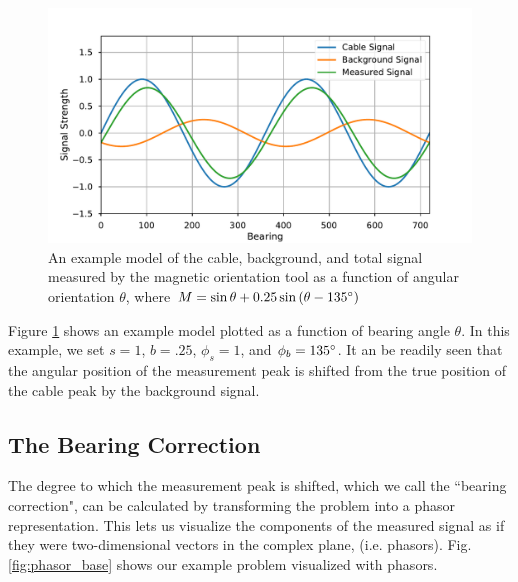 \documentclass[paper=a4, fontsize=11pt]{scrartcl}
\numberwithin{equation}{section}		%
\numberwithin{figure}{section}			%
\numberwithin{table}{section}				%
\begin{document}
\begin{appendices}
\begin{figure}[h!]
  \caption{An example model of the cable, background, and total signal measured by the magnetic orientation tool as a function of angular orientation $\theta$, where $M = \sin\theta + 0.25 \sin\left(\theta -135\degree\right)$
  }
  \label{fig:sigs_vs_bearing}
  \centering
  \includegraphics[width=1.0\textwidth]{figures/sigs_vs_bearing.pdf}
\end{figure}

Figure \ref{fig:sigs_vs_bearing} shows an example model plotted as a function of bearing angle $\theta$.  In this example, we set $s=1$, $b=.25$, $\phi_s=1$, and $\phi_b=135\degree$. It an be readily seen that the angular position of the measurement peak is shifted from the true position of the cable peak by the background signal.  

\subsection{The Bearing Correction}
The degree to which the measurement peak is shifted, which we call the ``bearing correction", can be calculated by transforming the problem into a phasor representation.  This lets us visualize the components of the measured signal as if they were two-dimensional vectors in the complex plane, (i.e. phasors). Fig. \ref{fig:phasor_base} shows our example problem visualized with phasors.


\end{appendices}
\end{document}
